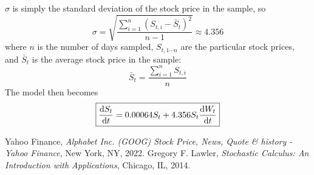 \documentclass[12pt, A4]{report}
\begin{document}
	\(\sigma\) is simply the standard deviation of the stock price in the sample, so 
		\[\sigma = \sqrt{\frac{\sum\limits_{i = 1}^n(S_{t, i} - \bar{S}_{t})^2}{n - 1}} \approx 4.356\]
		where \(n\) is the number of days sampled, \(S_{t, 1 \cdots n}\) are the particular stock prices, and \(\bar{S}_t\) is the average stock price in the sample:
		\[\bar{S}_t = \frac{\sum\limits_{i = 1}^nS_{t,i}}{n}\]
	The model then becomes
		\[\boxed{\dv{S_t}{t} = 0.00064S_t + 4.356S_t\dv{W_t}{t}}\]
	\begin{thebibliography}{1}
			Yahoo Finance,
			\textit{Alphabet Inc. (GOOG) Stock Price, News, Quote \& history - Yahoo Finance},
			New York, NY,
			2022.
			Gregory F. Lawler,
			\textit{Stochastic Calculus: An Introduction with Applications},
			Chicago, IL, 
			2014.
	\end{thebibliography}
\end{document}
